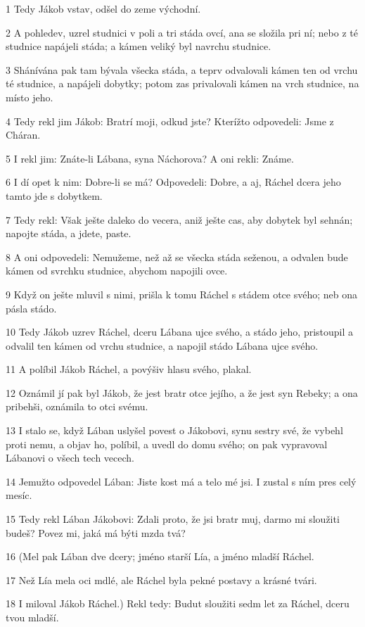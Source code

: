 \par 1 Tedy Jákob vstav, odšel do zeme východní.
\par 2 A pohledev, uzrel studnici v poli a tri stáda ovcí, ana se složila pri ní; nebo z té studnice napájeli stáda; a kámen veliký byl navrchu studnice.
\par 3 Shánívána pak tam bývala všecka stáda, a teprv odvalovali kámen ten od vrchu té studnice, a napájeli dobytky; potom zas privalovali kámen na vrch studnice, na místo jeho.
\par 4 Tedy rekl jim Jákob: Bratrí moji, odkud jste? Kterížto odpovedeli: Jsme z Cháran.
\par 5 I rekl jim: Znáte-li Lábana, syna Náchorova? A oni rekli: Známe.
\par 6 I dí opet k nim: Dobre-li se má? Odpovedeli: Dobre, a aj, Ráchel dcera jeho tamto jde s dobytkem.
\par 7 Tedy rekl: Však ješte daleko do vecera, aniž ješte cas, aby dobytek byl sehnán; napojte stáda, a jdete, paste.
\par 8 A oni odpovedeli: Nemužeme, než až se všecka stáda seženou, a odvalen bude kámen od svrchku studnice, abychom napojili ovce.
\par 9 Když on ješte mluvil s nimi, prišla k tomu Ráchel s stádem otce svého; neb ona pásla stádo.
\par 10 Tedy Jákob uzrev Ráchel, dceru Lábana ujce svého, a stádo jeho, pristoupil a odvalil ten kámen od vrchu studnice, a napojil stádo Lábana ujce svého.
\par 11 A políbil Jákob Ráchel, a povýšiv hlasu svého, plakal.
\par 12 Oznámil jí pak byl Jákob, že jest bratr otce jejího, a že jest syn Rebeky; a ona pribehši, oznámila to otci svému.
\par 13 I stalo se, když Lában uslyšel povest o Jákobovi, synu sestry své, že vybehl proti nemu, a objav ho, políbil, a uvedl do domu svého; on pak vypravoval Lábanovi o všech tech vecech.
\par 14 Jemužto odpovedel Lában: Jiste kost má a telo mé jsi. I zustal s ním pres celý mesíc.
\par 15 Tedy rekl Lában Jákobovi: Zdali proto, že jsi bratr muj, darmo mi sloužiti budeš? Povez mi, jaká má býti mzda tvá?
\par 16 (Mel pak Lában dve dcery; jméno starší Lía, a jméno mladší Ráchel.
\par 17 Než Lía mela oci mdlé, ale Ráchel byla pekné postavy a krásné tvári.
\par 18 I miloval Jákob Ráchel.) Rekl tedy: Budut sloužiti sedm let za Ráchel, dceru tvou mladší.
